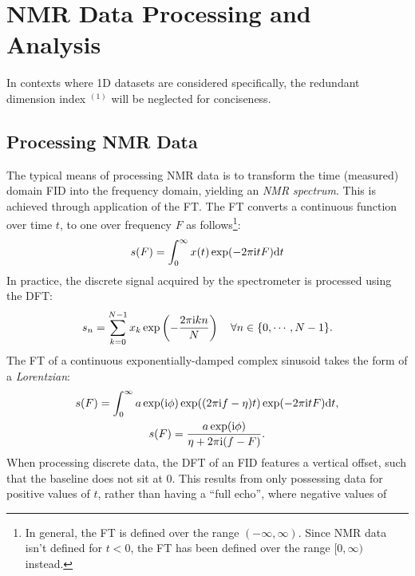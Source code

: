 \section{\acs{NMR} Data Processing and Analysis}
\begin{remark}
    In contexts where \ac{1D} datasets are considered specifically, the
    redundant dimension index $^{(1)}$ will be neglected for conciseness.
\end{remark}
\subsection{Processing NMR Data}
\label{subsec:nmr-proc}
The typical means of processing \ac{NMR} data is to
transform the time (measured) domain \ac{FID} into the frequency
domain, yielding an \emph{\ac{NMR} spectrum}. This is achieved through
application of the \ac{FT}. The \ac{FT} converts a continuous function over
time $t$, to one over frequency $F$ as follows\footnote{
    In general, the \ac{FT} is defined over the range $(-\infty, \infty)$.
    Since \ac{NMR} data isn't defined for $t < 0$, the \ac{FT} has been defined
    over the range  $[0, \infty)$ instead.
}:
\begin{equation}
    s(F) =  \int_{0}^{\infty} x(t) \exp(
        -2 \pi \mathrm{i} t F
        ) \mathrm{d} t
\end{equation}
In practice, the discrete signal acquired by the spectrometer is processed
using the \ac{DFT}:
\begin{equation}
    s_n = \sum_{k=0}^{N-1} x_k \exp \left(
            -\frac{2 \pi \mathrm{i} k n}{N} \right)
            \quad \forall n \in \lbrace 0, \cdots, N-1 \rbrace.
\end{equation}
The \ac{FT} of a continuous exponentially-damped complex sinusoid
takes the form of a \emph{Lorentzian}:
\begin{subequations}
    \begin{gather}
        s(F) = \int_0^{\infty}
            a \exp(\mathrm{i} \phi) \exp((2 \pi \mathrm{i} f - \eta)t)
            \exp(-2 \pi \mathrm{i} t F)
            \mathrm{d} t,\\
        s(F) = \frac{a \exp(\mathrm{i} \phi) }
            {\eta + 2 \pi \mathrm{i} (f - F)}.
    \end{gather}
    \label{eq:lorentzian}%
\end{subequations}
When processing discrete data, the \ac{DFT} of an \ac{FID}
features a vertical offset, such that the baseline does not sit at
0. This results from only possessing data for positive
values of $t$, rather than having a ``full echo'', where negative values of
